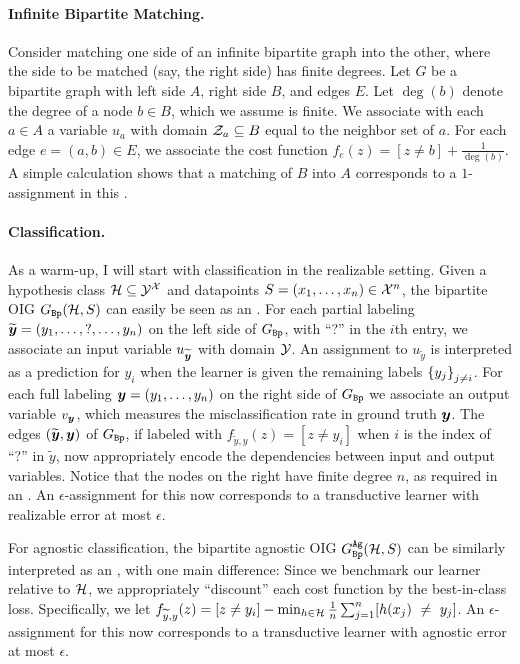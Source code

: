 \paragraph{Infinite Bipartite Matching.}  Consider  matching one side of an infinite bipartite graph into the other, where the side  to be matched (say, the right side) has finite degrees. Let $G$ be a bipartite graph with left side $A$, right side $B$, and edges $E$. Let $\deg(b)$ denote the degree of a node $b \in B$, which we assume is finite.  We associate with each $a \in A$ a variable $u_a$ with domain $\mathcal{Z}_a \subseteq B$ equal to the neighbor set of $a$. For each edge $e=(a,b) \in E$, we associate the cost function $f_e(z) = [z \neq b] + \frac{1}{\deg(b)}$. A simple calculation shows that a matching of $B$ into $A$ corresponds to a $1$-assignment in this \fds. %



\paragraph{Classification.} As a warm-up, I will start with classification in the realizable setting. Given a hypothesis class  $\mathcal{H} \subseteq \mathcal{Y}^{\mathcal{X}}$ and  datapoints $S=(x_1,\ldots,x_n) \in \mathcal{X}^n$,  the bipartite OIG $G_{\mathtt{Bp}}(\mathcal{H},S)$ can easily be seen as an \fds.  For each partial labeling $\widetilde{\boldsymbol{ y }}=(y_1,\ldots, ?, \ldots, y_n)$ on the left side of $G_{\mathtt{Bp}}$,  with ``?'' in the $i$th entry, we associate an input variable $u_{\widetilde{\boldsymbol{ y }}}$ with domain $\mathcal{Y}$. An assignment to $u_{\tilde{y}}$ is interpreted as a prediction for  $y_i$ when the learner is given the remaining labels $\left\{ y_j \right\}_{j \neq i}$. For each full labeling $\boldsymbol{ y }=(y_1,\ldots,y_n)$ on the right side of $G_{\mathtt{Bp}}$ we associate an output variable $v_{\boldsymbol{ y }}$, which measures the misclassification rate in  ground truth $\boldsymbol{ y }$. The edges $(\widetilde{\boldsymbol{ y }},\boldsymbol{ y })$ of $G_{\mathtt{Bp}}$, if labeled with $f_{\tilde{y},y}(z) = [z \neq y_i]$ when $i$ is the index of ``?'' in $\tilde{y}$, now appropriately encode the dependencies between input and output variables. Notice that the nodes on the right have finite degree $n$, as required in an \fds. An $\epsilon$-assignment for this \fds now corresponds to a  transductive learner with realizable error at most $\epsilon$.

For agnostic classification, the bipartite agnostic OIG $G_{\mathtt{Bp}}^{\mathtt{Ag}}(\mathcal{H},S)$ can be similarly interpreted as an \fds, with one main difference: Since we benchmark our learner relative to $\mathcal{H}$, we appropriately ``discount'' each cost function  by the best-in-class loss. Specifically, we let $f_{\tilde{y},y}(z) = [z \neq y_i] - \min_{h \in \H} \frac{1}{n} \sum_{j=1}^n  [h(x_j)~\neq~y_j]$. An $\epsilon$-assignment for this \fds now corresponds to a transductive learner with agnostic error at most $\epsilon$.




